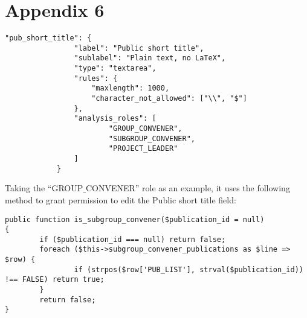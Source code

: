 \section*{Appendix 6}
\label{sec:app6}

\begin{lstlisting}
"pub_short_title": {
                "label": "Public short title",
                "sublabel": "Plain text, no LaTeX",
                "type": "textarea",
                "rules": {
                    "maxlength": 1000,
                    "character_not_allowed": ["\\", "$"]
                },
                "analysis_roles": [
                        "GROUP_CONVENER",
                        "SUBGROUP_CONVENER",
                        "PROJECT_LEADER"
                ]
            }
\end{lstlisting}

Taking the “GROUP$\_$CONVENER” role as an example, it uses the following method to grant permission to edit the Public short title field:

\begin{lstlisting}
public function is_subgroup_convener($publication_id = null)
{
        if ($publication_id === null) return false;
        foreach ($this->subgroup_convener_publications as $line => $row) {
                if (strpos($row['PUB_LIST'], strval($publication_id)) !== FALSE) return true;
        }
        return false;
}

\end{lstlisting}